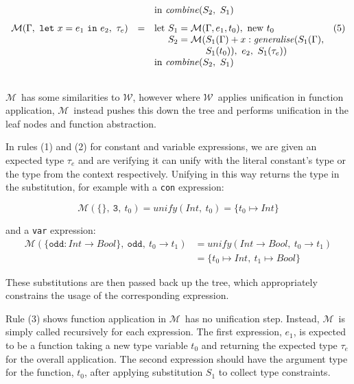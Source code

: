 \documentclass[a4paper,fleqn,oneside,12pt]{report}
\newcommand{\W}{$\mathcal{W}$}
\newcommand{\M}{$\mathcal{M}$}
\begin{document}
$$\begin{array}{lclc}
                                                                           &   & \textrm{in}\ \mathit{combine}(S_2,\ S_1) &\vspace{0.25cm}\\
    \mathcal{M}(\Gamma,\ \mathtt{let}\ x = e_1\ \mathtt{in}\ e_2,\ \tau_e) & = & \textrm{let}\ S_1 = \mathcal{M}(\Gamma, e_1, t_0),\ \textrm{new}\ t_0 & (5)\\
                                                                           &   & \phantom{\textrm{let}}\ S_2 = \mathcal{M}(S_1(\Gamma) + x : \mathit{generalise}(S_1(\Gamma),&\\
                                                                           &   & \phantom{\textrm{let}\ S_2 = \mathcal{M}(} S_1(t_0)),\ e_2,\ S_1(\tau_e)) &\\
                                                                           &   & \textrm{in}\ \mathit{combine}(S_2,\ S_1) &\\
  \\
\end{array}
$$

\M\ has some similarities to \W, however where \W\ applies unification in function application, \M\ instead pushes this down the tree and performs unification in the leaf nodes and function abstraction.

In rules (1) and (2) for constant and variable expressions, we are given an expected type $\tau_e$ and are verifying it can unify with the literal constant’s type or the type from the context respectively. Unifying in this way returns the type in the substitution, for example with a \texttt{con} expression:

$$\mathcal{M}(\{\},\ \mathtt{3},\ t_0) = \mathit{unify}(Int,\ t_0) = \{ t_0 \mapsto Int \}$$

and a \texttt{var} expression:
\begin{align*}
\mathcal{M}(\{ \mathtt{odd} : Int \rightarrow Bool \},\ \mathtt{odd},\ t_0 \rightarrow t_1)
& = \mathit{unify}(Int \rightarrow Bool,\ t_0 \rightarrow t_1)\\
& = \{ t_0 \mapsto Int,\ t_1 \mapsto Bool \}
\end{align*}

These substitutions are then passed back up the tree, which appropriately constrains the usage of the corresponding expression.

Rule (3) shows function application in \M\ has no unification step. Instead, \M\ is simply called recursively for each expression. The first expression, $e_1$, is expected to be a function taking a new type variable $t_0$ and returning the expected type $\tau_e$ for the overall application. The second expression should have the argument type for the function, $t_0$, after applying substitution $S_1$ to collect type constraints.
\end{document}
